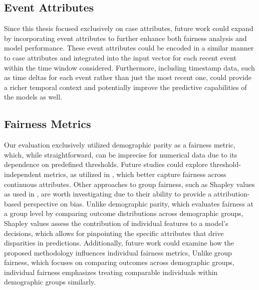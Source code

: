 \subsection*{Event Attributes}
Since this thesis focused exclusively on case attributes,
future work could expand by incorporating event attributes to further enhance both fairness analysis and model performance.
These event attributes could be encoded in a similar manner to case attributes
and integrated into the input vector for each recent event within the time window considered.
Furthermore, including timestamp data, such as time deltas for each event rather than just the most recent one,
could provide a richer temporal context and potentially improve the predictive capabilities of the models as well.

\subsection*{Fairness Metrics}
Our evaluation exclusively utilized demographic parity as a fairness metric, which, while straightforward,
can be imprecise for numerical data due to its dependence on predefined thresholds.
Future studies could explore threshold-independent metrics,
as utilized in \cite{fairness_independence}, which better capture fairness across continuous attributes.
Other approaches to group fairness, such as Shapley values \cite{shapley} as used in \cite{fairness_adversarial},
are worth investigating due to their ability to provide a attribution-based perspective on bias.
Unlike demographic parity, which evaluates fairness at a group level by comparing outcome distributions across demographic groups,
Shapley values assess the contribution of individual features to a model's decisions,
which allows for pinpointing the specific attributes that drive disparities in predictions.
Additionally, future work could examine how the proposed methodology influences individual fairness metrics,
Unlike group fairness, which focuses on comparing outcomes across demographic groups,
individual fairness emphasizes treating comparable individuals within demographic groups similarly.

